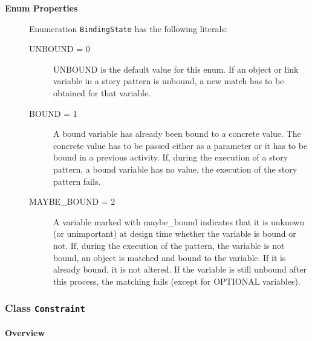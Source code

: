 	


\begin{description}

	\item[\textbf{Enum Properties}] Enumeration \texttt{BindingState} has the following literals:

	\begin{description}
		
		\item[UNBOUND = 0]
		\hspace{\fill}
		\nopagebreak
		
UNBOUND is the default value for this enum. If an object or link variable in a story pattern is unbound, a new match has to be obtained for that variable.	

		\item[BOUND = 1]
		\hspace{\fill}
		\nopagebreak
		
A bound variable has already been bound to a concrete value. The concrete value has to be passed either as a parameter or it has to be bound in a previous activity. If, during the execution of a story pattern, a bound variable has no value, the execution of the story pattern fails.	

		\item[MAYBE\_BOUND = 2]
		\hspace{\fill}
		\nopagebreak
		
A variable marked with maybe\_bound indicates that it is unknown (or unimportant) at design time whether the variable is bound or not. If, during the execution of the pattern, the variable is not bound, an object is matched and bound to the variable. If it is already bound, it is not altered. If the variable is still unbound after this process, the matching fails (except for OPTIONAL variables).	
 
	\end{description}

\end{description}



\subsubsection{\Large{Class \bfseries \texttt{Constraint}\normalfont}}
\label{cls:modeling::patterns::Constraint} 
\paragraph{Overview}

